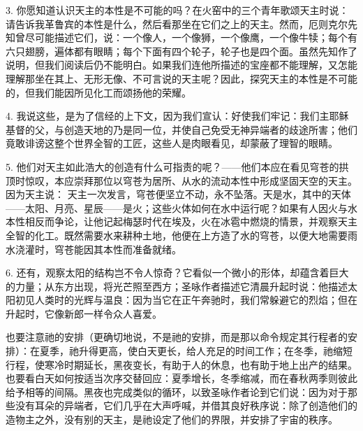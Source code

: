 3. 你愿知道认识天主的本性是不可能的吗？在火窑中的三个青年歌颂天主时说：请告诉我革鲁宾的本性是什么，然后看那坐在它们之上的天主。然而，厄则克尔先知曾尽可能描述它们，说：一个像人，一个像狮，一个像鹰，一个像牛犊；每个有六只翅膀，遍体都有眼睛；每个下面有四个轮子，轮子也是四个面。虽然先知作了说明，但我们阅读后仍不能明白。如果我们连他所描述的宝座都不能理解，又怎能理解那坐在其上、无形无像、不可言说的天主呢？因此，探究天主的本性是不可能的，但我们能因所见化工而颂扬他的荣耀。\par

4. 我说这些，是为了信经的上下文，因为我们宣认：好使我们牢记：我们主耶稣基督的父，与创造天地的乃是同一位，并使自己免受无神异端者的歧途所害；他们竟敢诽谤这整个世界全智的工匠，这些人是肉眼看见，却蒙蔽了理智的眼睛。\par

5. 他们对天主如此浩大的创造有什么可指责的呢？——他们本应在看见穹苍的拱顶时惊叹，本应崇拜那位以穹苍为居所、从水的流动本性中形成坚固天空的天主。因为天主说： 天主一次发言，穹苍便坚立不动，永不坠落。天是水，其中的天体——太阳、月亮、星辰——是火；这些火体如何在水中运行呢？如果有人因火与水本性相反而争论，让他记起梅瑟时代在埃及，火在冰雹中燃烧的情景，并观察天主全智的化工。既然需要水来耕种土地，他便在上方造了水的穹苍，以便大地需要雨水浇灌时，穹苍能因其本性而准备就绪。\par

6. 还有，观察太阳的结构岂不令人惊奇？它看似一个微小的形体，却蕴含着巨大的力量；从东方出现，将光芒照至西方；圣咏作者描述它清晨升起时说：他描述太阳初见人类时的光辉与温良：因为当它在正午奔驰时，我们常躲避它的烈焰；但在升起时，它像新郎一样令众人喜爱。\par

也要注意祂的安排（更确切地说，不是祂的安排，而是那以命令规定其行程者的安排）：在夏季，祂升得更高，使白天更长，给人充足的时间工作；在冬季，祂缩短行程，使寒冷时期延长，黑夜变长，有助于人的休息，也有助于地上出产的结果。也要看白天如何按适当次序交替回应：夏季增长，冬季缩减，而在春秋两季则彼此给予相等的间隔。黑夜也完成类似的循环，以致圣咏作者论到它们说：因为对于那些没有耳朵的异端者，它们几乎在大声呼喊，并借其良好秩序说：除了创造他们的造物主之外，没有别的天主，是祂设定了他们的界限，并安排了宇宙的秩序。\par

